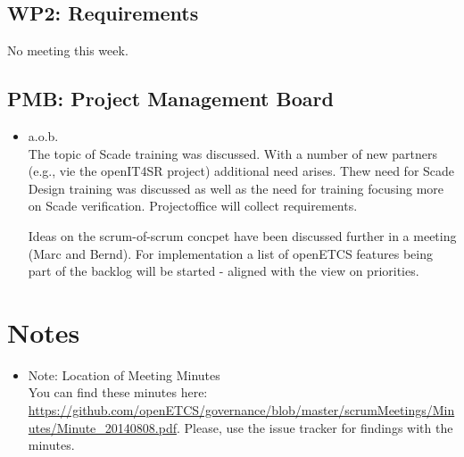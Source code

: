 \documentclass[a4paper, 11pt]{article}
\begin{document}
\subsection{WP2: Requirements}


No meeting this week.


\subsection{PMB: Project Management Board}
\begin{itemize}
\item a.o.b.\\
The topic of Scade training was discussed. With a number of new partners (e.g., vie the openIT4SR project) additional need arises. Thew need for Scade Design training was discussed as well as the need for training focusing more on Scade verification. Projectoffice will collect requirements.

Ideas on the scrum-of-scrum concpet have been discussed further in a meeting (Marc and Bernd). For implementation a list of openETCS features being part of the backlog will be started - aligned with the view on priorities.
\end{itemize}

\section{Notes}
\begin{itemize}

\item Note: Location of Meeting Minutes\\
You can find these minutes here: \url{https://github.com/openETCS/governance/blob/master/scrumMeetings/Minutes/Minute_20140808.pdf}. Please, use the issue tracker for findings with the minutes.

\end{itemize}
\end{document}
